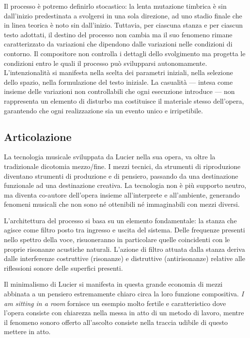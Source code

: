 Il processo è potremo definirlo stocastico: la lenta mutazione timbrica è sin dall'inizio predestinata a svolgersi in una sola direzione, ad uno stadio finale che in linea teorica è noto sin dall'inizio. Tuttavia, per ciascuna stanza e per ciascun testo adottati, il destino del processo non cambia ma il suo fenomeno rimane caratterizzato da variazioni che dipendono dalle variazioni nelle condizioni di contorno. Il compositore non controlla i dettagli dello svolgimento ma progetta le condizioni entro le quali il processo può svilupparsi autonomamente. L'intenzionalità si manifesta nella scelta dei parametri iniziali, nella selezione dello spazio, nella formulazione del testo iniziale. La casualità — intesa come insieme delle variazioni non controllabili che ogni esecuzione introduce — non rappresenta un elemento di disturbo ma costituisce il materiale stesso dell'opera, garantendo che ogni realizzazione sia un evento unico e irripetibile.
\subsection{Articolazione}
La tecnologia musicale sviluppata da Lucier nella sua opera, va oltre la tradizionale dicotomia mezzo/fine. I mezzi tecnici, da strumenti di riproduzione diventano strumenti di produzione e di pensiero, passando da una destinazione funzionale ad una destinazione creativa. La tecnologia non è più supporto neutro, ma diventa co-autore dell'opera insieme all'interprete e all'ambiente, generando fenomeni musicali che non sono né ottenibili né immaginabili con mezzi diversi.

L'architettura del processo si basa su un elemento fondamentale: la stanza che agisce come filtro posto tra ingresso e uscita del sistema. Delle frequenze presenti nello spettro della voce, risuoneranno in particolare quelle coincidenti con le proprie risonanze acustiche naturali. L'azione di filtro attuata dalla stanza deriva dalle interferenze costruttive (risonanze) e distruttive (antirisonanze) relative alle riflessioni sonore delle superfici presenti.

Il minimalismo di Lucier si manifesta in questa grande economia di mezzi abbinata a un pensiero estremamente chiaro circa la loro funzione compositiva. \textit{I am sitting in a room} fornisce un esempio molto fertile e caratteristico dove l'opera consiste con chiarezza nella messa in atto di un metodo di lavoro, mentre il fenomeno sonoro offerto all'ascolto consiste nella traccia udibile di questo mettere in atto.

